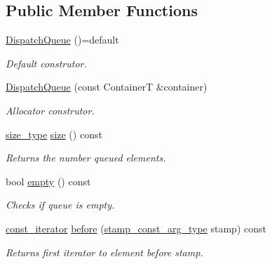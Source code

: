 \subsection*{Public Member Functions}
\begin{DoxyCompactItemize}
\item 
\mbox{\label{classflow_1_1_dispatch_queue_aa1002dcf3731bcdc31fe44760f6ba033}} 
\hyperlink{classflow_1_1_dispatch_queue_aa1002dcf3731bcdc31fe44760f6ba033}{Dispatch\+Queue} ()=default
\begin{DoxyCompactList}\small\item\em Default construtor. \end{DoxyCompactList}\item 
\mbox{\label{classflow_1_1_dispatch_queue_a5819de0ca2707479ac8a90234109427c}} 
\hyperlink{classflow_1_1_dispatch_queue_a5819de0ca2707479ac8a90234109427c}{Dispatch\+Queue} (const ContainerT \&container)
\begin{DoxyCompactList}\small\item\em Allocator construtor. \end{DoxyCompactList}\item 
\mbox{\label{classflow_1_1_dispatch_queue_a68f00b308869df4c313ad3ef7676ae44}} 
\hyperlink{classflow_1_1_dispatch_queue_afdc67058e3461410fdd6170046df55bc}{size\+\_\+type} \hyperlink{classflow_1_1_dispatch_queue_a68f00b308869df4c313ad3ef7676ae44}{size} () const
\begin{DoxyCompactList}\small\item\em Returns the number queued elements. \end{DoxyCompactList}\item 
bool \hyperlink{classflow_1_1_dispatch_queue_a447412abd83540a6c595dd7a17116c6c}{empty} () const
\begin{DoxyCompactList}\small\item\em Checks if queue is empty. \end{DoxyCompactList}\item 
\hyperlink{classflow_1_1_dispatch_queue_a307496fdc34a2d59e11114dabf85dc8a}{const\+\_\+iterator} \hyperlink{classflow_1_1_dispatch_queue_a0d73fa057b183d363c7da2871c34e0ba}{before} (\hyperlink{classflow_1_1_dispatch_queue_affc83531dc53ee147899a33e82a6cbf0}{stamp\+\_\+const\+\_\+arg\+\_\+type} stamp) const
\begin{DoxyCompactList}\small\item\em Returns first iterator to element before stamp. \end{DoxyCompactList}\item 

\end{DoxyCompactItemize}
